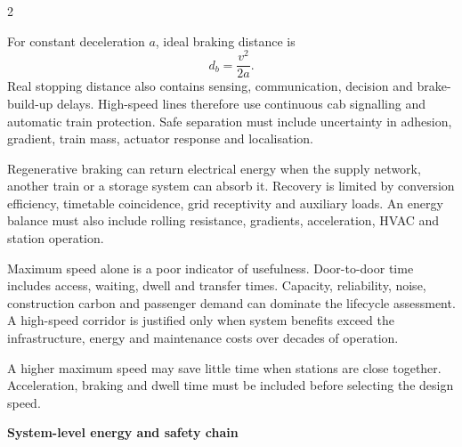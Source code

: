 \begin{multicols}{2}
\begin{ecarticle}
For constant deceleration $a$, ideal braking distance is
\[
d_b=\frac{v^2}{2a}.
\]
Real stopping distance also contains sensing, communication, decision and brake-build-up delays. High-speed lines
therefore use continuous cab signalling and automatic train protection. Safe separation must include uncertainty in
adhesion, gradient, train mass, actuator response and localisation.

Regenerative braking can return electrical energy when the supply network, another train or a storage system can
absorb it. Recovery is limited by conversion efficiency, timetable coincidence, grid receptivity and auxiliary
loads. An energy balance must also include rolling resistance, gradients, acceleration, HVAC and station operation.

Maximum speed alone is a poor indicator of usefulness. Door-to-door time includes access, waiting, dwell and
transfer times. Capacity, reliability, noise, construction carbon and passenger demand can dominate the lifecycle
assessment. A high-speed corridor is justified only when system benefits exceed the infrastructure, energy and
maintenance costs over decades of operation.
\end{ecarticle}

\begin{tcolorbox}[title=\sffamily\bfseries Engineering insight,colback=yellow!10,colframe=ECOrange]
A higher maximum speed may save little time when stations are close together. Acceleration, braking and dwell time
must be included before selecting the design speed.
\end{tcolorbox}

\begin{engineeringfocus}
\textbf{System-level energy and safety chain}
\begin{center}
\end{center}
\end{engineeringfocus}


\end{multicols}
